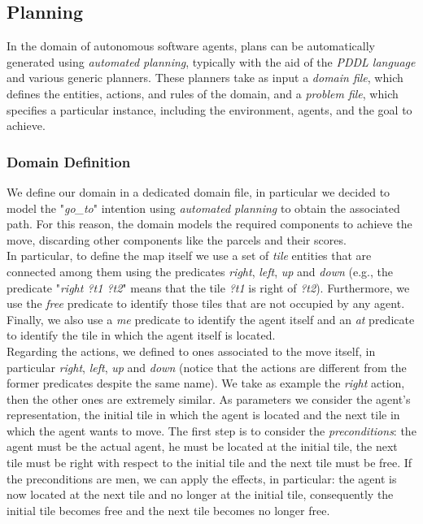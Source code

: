     \subsection{Planning}\label{planning}
        In the domain of autonomous software agents, plans can be automatically generated using \textit{automated planning}, typically with the aid of the \textit{PDDL language} and various generic planners. These planners take as input a \textit{domain file}, which defines the entities, actions, and rules of the domain, and a \textit{problem file}, which specifies a particular instance, including the environment, agents, and the goal to achieve.

        \subsubsection{Domain Definition}
            We define our domain in a dedicated domain file, in particular we decided to model the "\textit{go\_to}" intention using \textit{automated planning} to obtain the associated path. For this reason, the domain models the required components to achieve the move, discarding other components like the parcels and their scores.
            \medskip\\
            In particular, to define the map itself we use a set of \textit{tile} entities that are connected among them using the predicates \textit{right}, \textit{left}, \textit{up} and \textit{down} (e.g., the predicate "\textit{right ?t1 ?t2}" means that the tile \textit{?t1} is right of \textit{?t2}). Furthermore, we use the \textit{free} predicate to identify those tiles that are not occupied by any agent. Finally, we also use a \textit{me} predicate to identify the agent itself and an \textit{at} predicate to identify the tile in which the agent itself is located.
            \medskip\\
            Regarding the actions, we defined to ones associated to the move itself, in particular \textit{right}, \textit{left}, \textit{up} and \textit{down} (notice that the actions are different from the former predicates despite the same name). We take as example the \textit{right} action, then the other ones are extremely similar. As parameters we consider the agent's representation, the initial tile in which the agent is located and the next tile in which the agent wants to move. The first step is to consider the \textit{preconditions}: the agent must be the actual agent, he must be located at the initial tile, the next tile must be right with respect to the initial tile and the next tile must be free. If the preconditions are men, we can apply the effects, in particular: the agent is now located at the next tile and no longer at the initial tile, consequently the initial tile becomes free and the next tile becomes no longer free.

